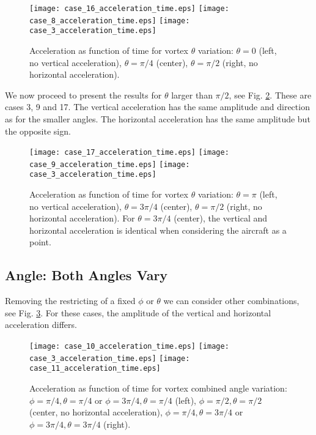 \documentclass[smallextended]{svjour3}       %
\begin{document}
\begin{figure}
\texttt{[image: case\_16\_acceleration\_time.eps]}
\hspace{0.5cm}
\texttt{[image: case\_8\_acceleration\_time.eps]}
\hspace{0.5cm}
\texttt{[image: case\_3\_acceleration\_time.eps]}
\caption{Acceleration as function of time for vortex $\theta$ variation: $\theta=0$ (left, no vertical acceleration), $\theta=\pi/4$ (center), $\theta=\pi/2$ (right, no horizontal acceleration).}
\label{fig:theta_vary_acc_small}
\end{figure}

We now proceed to present the results for $\theta$ larger than $\pi/2$, see Fig. \ref{fig:theta_vary_acc_large}. These are cases 3, 9 and 17. The vertical acceleration has the same amplitude and direction as for the smaller angles. The horizontal acceleration has the same amplitude but the opposite sign.

\begin{figure}
\texttt{[image: case\_17\_acceleration\_time.eps]}
\hspace{0.5cm}
\texttt{[image: case\_9\_acceleration\_time.eps]}
\hspace{0.5cm}
\texttt{[image: case\_3\_acceleration\_time.eps]}
\caption{Acceleration as function of time for vortex $\theta$ variation: $\theta=\pi$ (left, no vertical acceleration), $\theta=3\pi/4$ (center), $\theta=\pi/2$ (right, no horizontal acceleration). For $\theta=3\pi/4$ (center), the vertical and horizontal acceleration is identical when considering the aircraft as a point.}
\label{fig:theta_vary_acc_large}
\end{figure}

\subsection{Angle: Both Angles Vary}

Removing the restricting of a fixed $\phi$ or $\theta$ we can consider other combinations, see Fig. \ref{fig:both_vary_acc_lo_phi}. For these cases, the amplitude of the vertical and horizontal acceleration differs.

\begin{figure}
\texttt{[image: case\_10\_acceleration\_time.eps]}
\hspace{0.5cm}
\texttt{[image: case\_3\_acceleration\_time.eps]}
\hspace{0.5cm}
\texttt{[image: case\_11\_acceleration\_time.eps]}
\caption{Acceleration as function of time for vortex combined angle variation: $\phi=\pi/4, \theta=\pi/4$ or $\phi=3\pi/4, \theta=\pi/4$ (left), $\phi=\pi/2, \theta=\pi/2$ (center, no horizontal acceleration), $\phi=\pi/4, \theta=3\pi/4$ or $\phi=3\pi/4, \theta=3\pi/4$ (right).}
\label{fig:both_vary_acc_lo_phi}
\end{figure}
\end{document}
